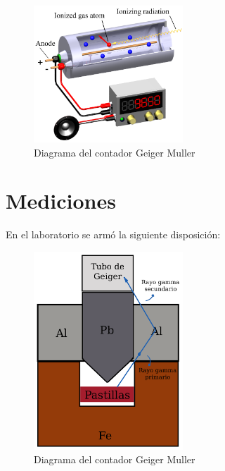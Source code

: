 \documentclass[a4paper,12pt]{report}
\begin{document}
    \begin{figure}[h]
        \centering
        \includegraphics[width=0.5\textwidth]{images/gmCounter.png}
        \caption{Diagrama del contador Geiger Muller}
        \label{fig:etiqueta}
    \end{figure}

  \newpage
  \section{Mediciones}
    En el laboratorio se armó la siguiente disposición:
    \begin{figure}[h]
        \centering
        \includegraphics[width=0.5\textwidth]{images/diagrama.png}
        \caption{Diagrama del contador Geiger Muller}
        \label{fig:etiqueta}
    \end{figure}
\end{document}
